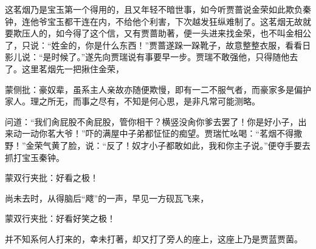 \begin{parag}
    这茗烟乃是宝玉第一个得用的，且又年轻不暗世事，如今听贾蔷说金荣如此欺负秦钟，连他爷宝玉都干连在内，不给他个利害，下次越发狂纵难制了。这茗烟无故就要欺压人的，如今得了这个信，又有贾蔷助著，便一头进来找金荣，也不叫金相公了，只说：“姓金的，你是什么东西！”贾蔷遂跺一跺靴子，故意整整衣服，看看日影儿说：“是时候了。”遂先向贾瑞说有事要早一步。贾瑞不敢强他，只得随他去了。这里茗烟先一把揪住金荣，\begin{note}蒙侧批：豪奴辈，虽系主人亲故亦随便欺慢，即有一二不服气者，而豪家多是偏护家人。理之所无，而事之尽有，不知是何心思，是非凡常可能测略。\end{note}问道：“我们肏屁股不肏屁股，管你相干？横竖没肏你爹去罢了！你是好小子，出来动一动你茗大爷！”吓的满屋中子弟都怔怔的痴望。贾瑞忙吆喝：“茗烟不得撒野！”金荣气黄了脸，说：“反了！奴才小子都敢如此，我和你主子说。”便夺手要去抓打宝玉秦钟。\begin{note}蒙双行夹批：好看之极！\end{note}尚未去时，从得脑后“飕”的一声，早见一方砚瓦飞来，\begin{note}蒙双行夹批：好看好笑之极！\end{note}并不知系何人打来的，幸未打著，却又打了旁人的座上，这座上乃是贾蓝贾菌。
\end{parag}


